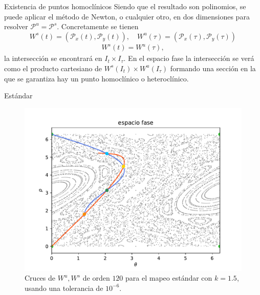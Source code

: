 \documentclass[11pt]{beamer}
\theoremstyle{definition}
\begin{document}
\begin{frame}{Existencia de puntos homocl\'inicos}
\justifying
Siendo que el resultado son polinomios, se puede aplicar el método de Newton, o cualquier otro, en dos dimensiones para resolver $\mathcal{P}^{u}=\mathcal{P}^{s}$.
Concretamente se tienen \\
\begin{equation}
W^{s}(t)=(\mathcal{P}_{x}(t),\mathcal{P}_{y}(t)) ,\quad W^{u}(\tau)=(\mathcal{P}_{x}(\tau),\mathcal{P}_{y}(\tau))
\end{equation}
\begin{eqnarray}
W^{s}(t)=W^{u}(\tau),
\end{eqnarray}
\justifying
la intersección se encontrará en $I_{t}\times I_{\tau}$. En el espacio fase la intersección se verá como el producto cartesiano de $W^{s}(I_{t})\times W^{u}(I_{\tau})$ formando una sección en la que se garantiza hay un punto homoclínico o heteroclínico. 
\end{frame}
\begin{frame}{Est\'andar}
\begin{figure}
\centering
\includegraphics[scale=0.5]{cruce_estandar}
\caption{Cruces de $W^{u},W^{s}$ de orden $120$ para el mapeo estándar con $k=1.5$, usando una tolerancia de $10^{-6}$.}
\label{cruce_estandar}
\end{figure}

\end{frame}
\end{document}
